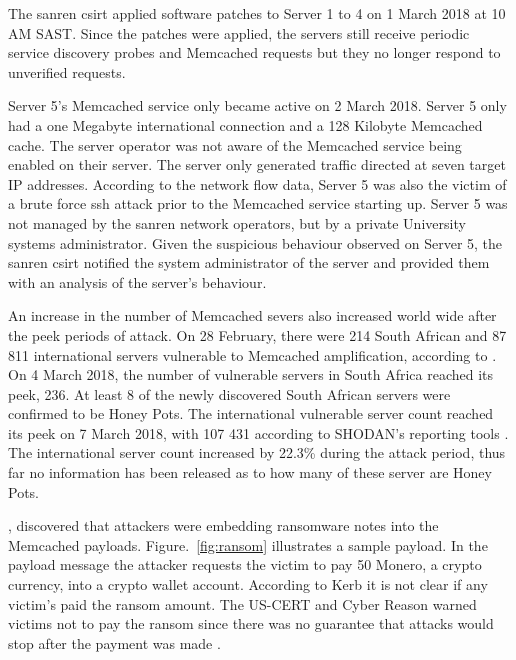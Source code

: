 The \gls{sanren} \gls{csirt} applied software patches to Server 1 to 4 on 1 March 2018 at 10 AM SAST. Since the patches were applied, the servers still receive periodic service discovery probes and Memcached requests but they no longer respond to unverified requests.

Server 5's Memcached service only became active on 2 March 2018. Server 5 only had a one Megabyte international connection and a 128 Kilobyte Memcached cache. The server operator was not aware of the Memcached service being enabled on their server. The server only generated traffic directed at seven target IP addresses. According to the network flow data, Server 5 was also the victim of a brute force \gls{ssh} attack prior to the Memcached service starting up. Server 5 was not managed by the \gls{sanren} network operators, but by a private University systems administrator. Given the suspicious behaviour observed on Server 5, the \gls{sanren} \gls{csirt} notified the system administrator of the server and provided them with an analysis of the server's behaviour. 


An increase in the number of Memcached severs also increased world wide after the peek periods of attack. On 28 February, there were 214 South African and 87 811 international servers vulnerable to Memcached amplification, according to \cite{Shodan}. On 4 March 2018, the number of vulnerable servers in South Africa reached its peek, 236. At least 8 of the newly discovered South African servers were confirmed to be Honey Pots. The international vulnerable server count reached its peek on 7 March 2018, with 107 431 according to SHODAN's reporting tools  \citep{Shodan}. The international server count increased by 22.3\% during the attack period, thus far no information has been released as to how many of these server are Honey Pots.    

\cite{CyberReason},  discovered that attackers were embedding ransomware notes into the Memcached payloads. Figure.~\ref{fig:ransom} illustrates a sample payload. In the payload message the attacker requests the victim to pay 50 Monero, a crypto currency, into a crypto wallet account. According to Kerb \cite{kerbs2018Powerful} it is not clear if any victim's paid the ransom amount. The US-CERT and Cyber Reason warned victims not to pay the ransom since there was no guarantee that attacks would stop after the payment was made \citep{kerbs2018Powerful,CyberReason}.

